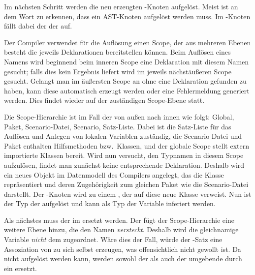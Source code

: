 
Im nächsten Schritt werden die neu erzeugten -Knoten aufgelöst.
Meist ist an dem Wort  zu erkennen, dass ein AST-Knoten aufgelöst werden muss.
Im -Knoten fällt dabei der  der  auf.

Der Compiler verwendet für die Auflösung einen Scope, der aus mehreren Ebenen besteht die jeweils Deklarationen bereitstellen können.
Beim Auflösen eines Namens wird beginnend beim inneren Scope eine Deklaration mit diesem Namen gesucht;
falls dies kein Ergebnis liefert wird im jeweils nächstäußeren Scope gesucht.
Gelangt man im äußersten Scope an ohne eine Deklaration gefunden zu haben,
kann diese automatisch erzeugt werden oder eine Fehlermeldung generiert werden.
Dies findet wieder auf der zuständigen Scope-Ebene statt.

Die Scope-Hierarchie ist im Fall der  von außen nach innen wie folgt:
Global, Paket, Scenario-Datei, Scenario, Satz-Liste.
Dabei ist die Satz-Liste für das Auflösen und Anlegen von lokalen Variablen zuständig,
die Scenario-Datei und Paket enthalten Hilfsmethoden bzw.\ Klassen,
und der globale Scope stellt extern importierte Klassen bereit.
Wird nun versucht, den Typnamen  in diesem Scope aufzulösen,
findet man zunächst keine entsprechende Deklaration.
Deshalb wird ein neues Objekt im Datenmodell des Compilers angelegt,
das die Klasse  repräsentiert und deren Zugehörigkeit zum gleichen Paket wie die Scenario-Datei darstellt.
Der -Knoten wird zu einem , der auf diese neue Klasse verweist.
Nun ist der Typ der  aufgelöst und kann als Typ der Variable  inferiert werden.

Als nächstes muss der  im  ersetzt werden.
Der  fügt der Scope-Hierarchie eine weitere Ebene hinzu, die den Namen  \emph{versteckt}.
Deshalb wird die gleichnamige Variable \emph{nicht} dem  zugeordnet.
Wäre dies der Fall, würde der -Satz eine Assoziation von  zu sich selbst erzeugen,
was offensichtlich nicht gewollt ist.
Da  nicht aufgelöst werden kann, werden sowohl der  als auch der umgebende  durch ein  ersetzt.

